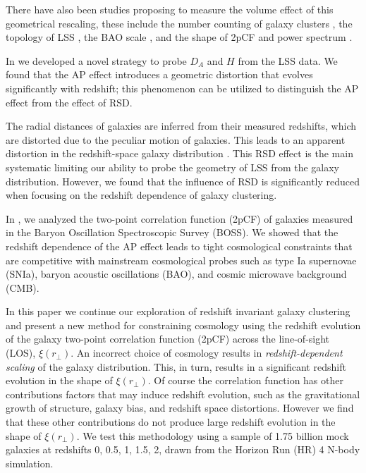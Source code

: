 \documentclass[iop]{emulateapj}
\begin{document}
There have also been studies proposing to measure the volume effect of this geometrical rescaling, 
these include the number counting of galaxy clusters \citep{PS1974,VL1996}, 
the topology of LSS \citep{topology}, the BAO scale \citep{EHT1998,BG03,SE03}, 
and the shape of 2pCF and power spectrum \citep{Sanchez2006,Sanchez2009}.

In \cite{Li2014,Li2015} we developed a novel strategy to probe $D_A$ and $H$ from the LSS data. 
We found that the AP effect introduces a geometric distortion that evolves significantly with redshift;
this phenomenon can be utilized to distinguish the AP effect from the effect of RSD.

The radial distances of galaxies are inferred from their measured redshifts, 
which are distorted due to the peculiar motion of galaxies. 
This leads to an apparent distortion in the redshift-space galaxy distribution \citep{FOG,Kaiser1987,Ballinger1996}. 
This RSD effect is the main systematic limiting our ability to probe the geometry of LSS from the galaxy distribution. 
However, we found that the influence of RSD is significantly reduced when focusing on the redshift dependence of galaxy clustering. 

In \cite{Li2016}, we analyzed the two-point correlation function (2pCF) of galaxies measured in the Baryon Oscillation Spectroscopic Survey (BOSS). 
We showed that the redshift dependence of the AP effect leads to tight cosmological constraints that are competitive with mainstream cosmological probes such as type Ia supernovae (SNIa), baryon acoustic oscillations (BAO), and cosmic microwave background (CMB).


In this paper we continue our exploration of redshift invariant galaxy clustering 
and present a new method for constraining cosmology using the redshift evolution of 
the galaxy two-point correlation function (2pCF) across the line-of-sight (LOS), $\xi(r_{\bot})$. 
An incorrect choice of cosmology results in {\it redshift-dependent scaling} of the galaxy distribution. 
This, in turn, results in a significant redshift evolution in the shape of $\xi(r_{\bot})$.
Of course the correlation function has other contributions factors that may induce redshift evolution, 
such as the gravitational growth of structure, galaxy bias, and redshift space distortions. 
However we find that these other contributions do not produce large redshift evolution in the shape of $\xi(r_{\bot})$. 
We test this methodology using a sample of 1.75 billion mock galaxies at redshifts 0, 0.5, 1, 1.5, 2, drawn from the Horizon Run (HR) 4 N-body simulation.
 
\end{document}
